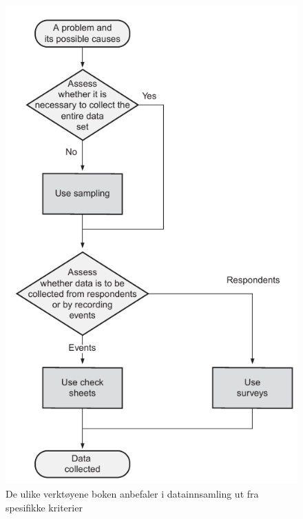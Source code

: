 \begin{figure}[H]
    \centering
    \includegraphics[scale=0.65]{main/bilder/verktoyvalg/verktoyvalg_datainnsamling.pdf}
    \caption[Verktøyvalg for datainnsamling]{De ulike verktøyene boken anbefaler i datainnsamling ut fra spesifikke kriterier}
    \label{fig:verktoyvalg-datainnsamling}
\end{figure}

